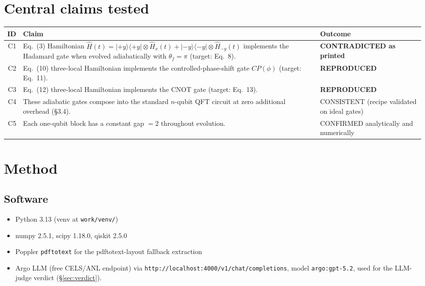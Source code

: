 \documentclass[11pt]{article}
\begin{document}
\section{Central claims tested}
\label{sec:claims}

\begin{center}
\begin{tabular}{@{}rp{9cm}l@{}}
\toprule
ID & Claim & Outcome \\
\midrule
C1 & Eq.~(3) Hamiltonian $\hat H(t) = |{+}y\rangle\langle{+}y|\otimes\hat H_x(t) + |{-}y\rangle\langle{-}y|\otimes\hat H_{-y}(t)$ implements the Hadamard gate when evolved adiabatically with $\theta_f=\pi$ (target: Eq.~8). & \textbf{CONTRADICTED as printed} \\
C2 & Eq.~(10) three-local Hamiltonian implements the controlled-phase-shift gate $CP(\phi)$ (target: Eq.~11). & \textbf{REPRODUCED} \\
C3 & Eq.~(12) three-local Hamiltonian implements the CNOT gate (target: Eq.~13). & \textbf{REPRODUCED} \\
C4 & These adiabatic gates compose into the standard $n$-qubit QFT circuit at zero additional overhead (\S 3.4). & CONSISTENT (recipe validated on ideal gates) \\
C5 & Each one-qubit block has a constant gap $= 2$ throughout evolution. & CONFIRMED analytically and numerically \\
\bottomrule
\end{tabular}
\end{center}

\section{Method}
\label{sec:method}

\subsection{Software}
\begin{itemize}
\item Python 3.13 (venv at \texttt{work/venv/})
\item numpy 2.5.1, scipy 1.18.0, qiskit 2.5.0
\item Poppler \texttt{pdftotext} for the pdftotext-layout fallback extraction
\item Argo LLM (free CELS/ANL endpoint) via \texttt{http://localhost:4000/v1/chat/completions}, model \texttt{argo:gpt-5.2}, used for the LLM-judge verdict (\S \ref{sec:verdict}).
\end{itemize}
\end{document}
